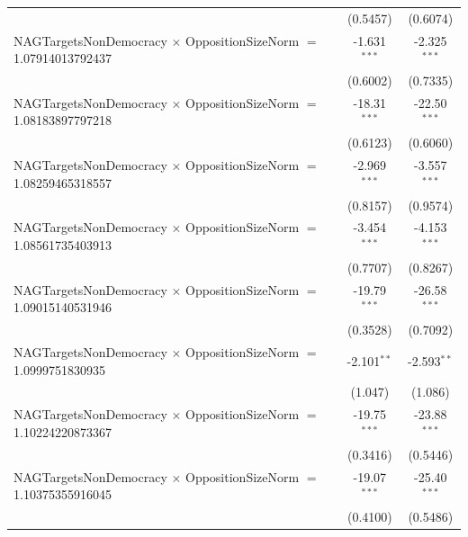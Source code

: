 \begin{tabular}{lcc}
                                                                                & (0.5457)             & (0.6074)\\   
   NAGTargetsNonDemocracy $\times$ OppositionSizeNorm $=$ 1.07914013792437      & -1.631$^{***}$       & -2.325$^{***}$\\   
                                                                                & (0.6002)             & (0.7335)\\   
   NAGTargetsNonDemocracy $\times$ OppositionSizeNorm $=$ 1.08183897797218      & -18.31$^{***}$       & -22.50$^{***}$\\   
                                                                                & (0.6123)             & (0.6060)\\   
   NAGTargetsNonDemocracy $\times$ OppositionSizeNorm $=$ 1.08259465318557      & -2.969$^{***}$       & -3.557$^{***}$\\   
                                                                                & (0.8157)             & (0.9574)\\   
   NAGTargetsNonDemocracy $\times$ OppositionSizeNorm $=$ 1.08561735403913      & -3.454$^{***}$       & -4.153$^{***}$\\   
                                                                                & (0.7707)             & (0.8267)\\   
   NAGTargetsNonDemocracy $\times$ OppositionSizeNorm $=$ 1.09015140531946      & -19.79$^{***}$       & -26.58$^{***}$\\   
                                                                                & (0.3528)             & (0.7092)\\   
   NAGTargetsNonDemocracy $\times$ OppositionSizeNorm $=$ 1.0999751830935       & -2.101$^{**}$        & -2.593$^{**}$\\   
                                                                                & (1.047)              & (1.086)\\   
   NAGTargetsNonDemocracy $\times$ OppositionSizeNorm $=$ 1.10224220873367      & -19.75$^{***}$       & -23.88$^{***}$\\   
                                                                                & (0.3416)             & (0.5446)\\   
   NAGTargetsNonDemocracy $\times$ OppositionSizeNorm $=$ 1.10375355916045      & -19.07$^{***}$       & -25.40$^{***}$\\   
                                                                                & (0.4100)             & (0.5486)\\   

\end{tabular}
